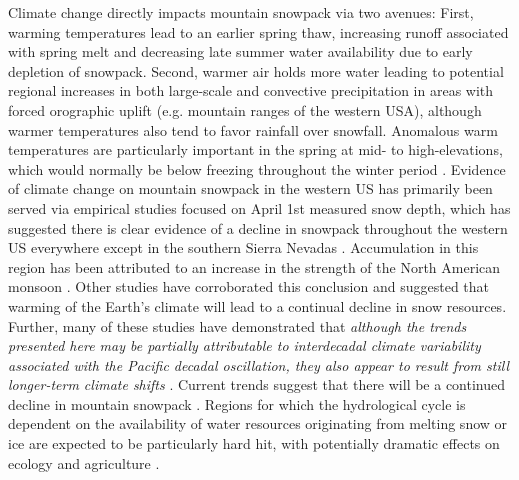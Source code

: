 \documentclass[11pt]{article}
\begin{document}
Climate change directly impacts mountain snowpack via two avenues: First, warming temperatures lead to an earlier spring thaw, increasing runoff associated with spring melt and decreasing late summer water availability due to early depletion of snowpack. Second, warmer air holds more water leading to potential regional increases in both large-scale and convective precipitation in areas with forced orographic uplift (e.g. mountain ranges of the western USA), although warmer temperatures also tend to favor rainfall over snowfall. Anomalous warm temperatures are particularly important in the spring at mid- to high-elevations, which would normally be below freezing throughout the winter period \citep{cayan1996interannual,stewart2009changes}. Evidence of climate change on mountain snowpack in the western US has primarily been served via empirical studies focused on April 1st measured snow depth, which has suggested there is clear evidence of a decline in snowpack throughout the western US everywhere except in the southern Sierra Nevadas \citep{mote_declining_2005; bales2006mountain}. Accumulation in this region has been attributed to an increase in the strength of the North American monsoon \citep{dyer2006spatial}. Other studies have corroborated this conclusion \citep{dettinger1995large,mote_declining_2005,knowles2006trends} and suggested that warming of the Earth's climate will lead to a continual decline in snow resources. Further, many of these studies have demonstrated that \textit{although the trends presented here may be partially attributable to interdecadal climate variability associated with the Pacific decadal oscillation, they also appear to result from still longer-term climate shifts} \citep{knowles2006trends}. Current trends suggest that there will be a continued decline in mountain snowpack \citep{stewart2009changes}. Regions for which the hydrological cycle is dependent on the availability of water resources originating from melting snow or ice are expected to be particularly hard hit, with potentially dramatic effects on ecology and agriculture \citep{barnett2005potential}.
\end{document}
